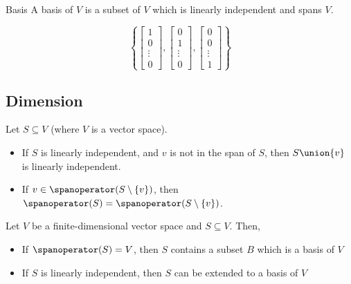 \begin{definition}{Basis}
  A basis of $V$ is a subset of $V$ which is linearly independent and spans $V$.
\end{definition}

\begin{definition}
  \[
    \left\{
      \begin{bmatrix}
        1 \\
        0 \\ 
        \vdots \\
        0
      \end{bmatrix},
      \begin{bmatrix}
        0 \\
        1 \\ 
        \vdots \\
        0
      \end{bmatrix},
      \begin{bmatrix}
        0 \\
        0 \\ 
        \vdots \\
        1
      \end{bmatrix}
    \right\}
  \]
\end{definition}

\begin{definition}[$P_m(F)$]
\end{definition}

\begin{definition}
\end{definition}

\subsection{Dimension}

\begin{namedtheorem}
  Let $S \subseteq V$ (where $V$ is a vector space).
  \begin{itemize}
    \item If $S$ is linearly independent, and $v$ is not in the span of $S$, then $S \union \{v\}$ is linearly independent.
    \item If $v \in \spanoperator(S \setminus \{v\})$, then $\spanoperator(S) = \spanoperator(S \setminus \{v\})$.
  \end{itemize}
\end{namedtheorem}

\begin{theorem}
  Let $V$ be a finite-dimensional vector space and $S \subseteq V$. Then,
  \begin{itemize}
    \item If $\spanoperator(S) = V$, then $S$ contains a subset $B$ which is a basis of $V$
    \item If $S$ is linearly independent, then $S$ can be extended to a basis of $V$
  \end{itemize}
\end{theorem}

